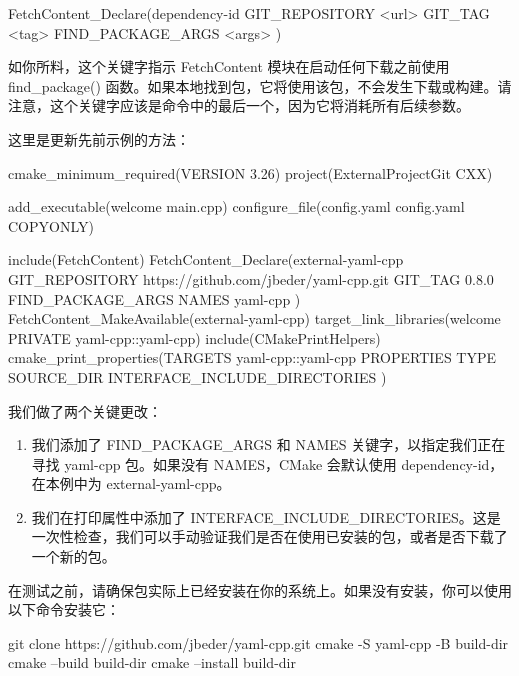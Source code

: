 \begin{shell}
FetchContent_Declare(dependency-id
                     GIT_REPOSITORY <url>
                     GIT_TAG <tag>
                     FIND_PACKAGE_ARGS <args>
)
\end{shell}

如你所料，这个关键字指示 FetchContent 模块在启动任何下载之前使用 find\_package() 函数。如果本地找到包，它将使用该包，不会发生下载或构建。请注意，这个关键字应该是命令中的最后一个，因为它将消耗所有后续参数。

这里是更新先前示例的方法：


\begin{cmake}
cmake_minimum_required(VERSION 3.26)
project(ExternalProjectGit CXX)

add_executable(welcome main.cpp)
configure_file(config.yaml config.yaml COPYONLY)

include(FetchContent)
FetchContent_Declare(external-yaml-cpp
    GIT_REPOSITORY    https://github.com/jbeder/yaml-cpp.git
    GIT_TAG           0.8.0
    FIND_PACKAGE_ARGS NAMES yaml-cpp
)
FetchContent_MakeAvailable(external-yaml-cpp)
target_link_libraries(welcome PRIVATE yaml-cpp::yaml-cpp)
include(CMakePrintHelpers)
cmake_print_properties(TARGETS yaml-cpp::yaml-cpp
                       PROPERTIES TYPE SOURCE_DIR
                       INTERFACE_INCLUDE_DIRECTORIES
)
\end{cmake}

我们做了两个关键更改：

\begin{enumerate}
\item
我们添加了 FIND\_PACKAGE\_ARGS 和 NAMES 关键字，以指定我们正在寻找 yaml-cpp 包。如果没有 NAMES，CMake 会默认使用 dependency-id，在本例中为 external-yaml-cpp。

\item
我们在打印属性中添加了 INTERFACE\_INCLUDE\_DIRECTORIES。这是一次性检查，我们可以手动验证我们是否在使用已安装的包，或者是否下载了一个新的包。
\end{enumerate}

在测试之前，请确保包实际上已经安装在你的系统上。如果没有安装，你可以使用以下命令安装它：

\begin{shell}
git clone https://github.com/jbeder/yaml-cpp.git
cmake -S yaml-cpp -B build-dir
cmake --build build-dir
cmake --install build-dir
\end{shell}

